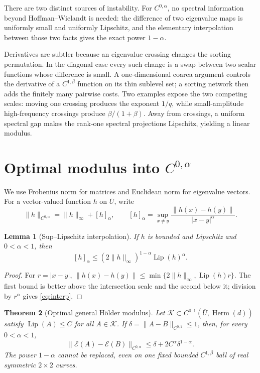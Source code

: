 \documentclass[10pt]{article}
\newtheorem{theorem}{Theorem}
\newtheorem{lemma}[theorem]{Lemma}
\newcommand{\E}{\mathcal E}
\newcommand{\Herm}{\operatorname{Herm}}
\newcommand{\Lip}{\operatorname{Lip}}
\begin{document}
There are two distinct sources of instability.  For $C^{0,\alpha}$, no
spectral information beyond Hoffman--Wielandt is needed: the difference of
two eigenvalue maps is uniformly small and uniformly Lipschitz, and the
elementary interpolation between those two facts gives the exact power
$1-\alpha$.

Derivatives are subtler because an eigenvalue crossing changes the sorting
permutation.  In the diagonal case every such change is a swap between two
scalar functions whose difference is small.  A one-dimensional coarea
argument controls the derivative of a $C^{1,\beta}$ function on its thin
sublevel set; a sorting network then adds the finitely many pairwise costs.
Two examples expose the two competing scales: moving one crossing produces
the exponent $1/q$, while small-amplitude high-frequency crossings produce
$\beta/(1+\beta)$.  Away from crossings, a uniform spectral gap makes the
rank-one spectral projections Lipschitz, yielding a linear modulus.

\section{Optimal modulus into \texorpdfstring{$C^{0,\alpha}$}{Holder spaces}}

We use Frobenius norm for matrices and Euclidean norm for eigenvalue vectors.
For a vector-valued function $h$ on $\overline U$, write
\[
 \|h\|_{C^{0,\alpha}}=\|h\|_\infty+[h]_\alpha,
 \qquad [h]_\alpha=\sup_{x\ne y}\frac{\|h(x)-h(y)\|}{|x-y|^\alpha}.
\]

\begin{lemma}[Sup--Lipschitz interpolation]\label{lem:interp}
If $h$ is bounded and Lipschitz and $0<\alpha<1$, then
\begin{equation}\label{eq:interp}
 [h]_\alpha\leq (2\|h\|_\infty)^{1-\alpha}\Lip(h)^\alpha.
\end{equation}
\end{lemma}

\begin{proof}
For $r=|x-y|$,
$\|h(x)-h(y)\|\leq\min\{2\|h\|_\infty,\Lip(h)r\}$.
The first bound is better above the intersection scale and the second below
it; division by $r^\alpha$ gives \eqref{eq:interp}.
\end{proof}

\begin{theorem}[Optimal general H\"older modulus]\label{thm:holder}
Let $\mathcal K\subset C^{0,1}(\overline U,\Herm(d))$ satisfy
$\Lip(A)\leq C$ for all $A\in\mathcal K$.  If
$\delta=\|A-B\|_{C^{0,1}}\leq1$, then, for every $0<\alpha<1$,
\begin{equation}\label{eq:holder}
 \|\E(A)-\E(B)\|_{C^{0,\alpha}}
 \leq \delta+2C^\alpha\delta^{1-\alpha}.
\end{equation}
The power $1-\alpha$ cannot be replaced, even on one fixed bounded
$C^{1,\beta}$ ball of real symmetric $2\times2$ curves.
\end{theorem}
\end{document}
